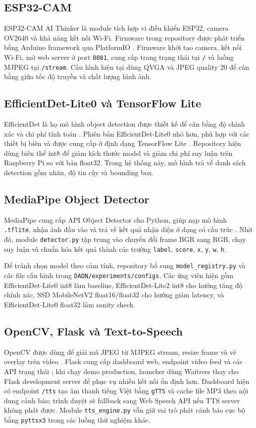 \documentclass[oneside,final]{hcmut-report}
\begin{document}
\subsection{ESP32-CAM}
ESP32-CAM AI Thinker là module tích hợp vi điều khiển ESP32, camera OV2640 và khả năng kết nối Wi-Fi. Firmware trong repository được phát triển bằng Arduino framework qua PlatformIO \citep{platformio}. Firmware khởi tạo camera, kết nối Wi-Fi, mở web server ở port \texttt{8081}, cung cấp trang trạng thái tại \texttt{/} và luồng MJPEG tại \texttt{/stream}. Cấu hình hiện tại dùng QVGA và JPEG quality 20 để cân bằng giữa tốc độ truyền và chất lượng hình ảnh.

\subsection{EfficientDet-Lite0 và TensorFlow Lite}
EfficientDet là họ mô hình object detection được thiết kế để cân bằng độ chính xác và chi phí tính toán \citep{tan2020efficientdet}. Phiên bản EfficientDet-Lite0 nhỏ hơn, phù hợp với các thiết bị biên và được cung cấp ở định dạng TensorFlow Lite \citep{tensorflowlite}. Repository hiện dùng biến thể int8 để giảm kích thước model và giảm chi phí suy luận trên Raspberry Pi so với bản float32. Trong hệ thống này, mô hình trả về danh sách detection gồm nhãn, độ tin cậy và bounding box.

\subsection{MediaPipe Object Detector}
MediaPipe cung cấp API Object Detector cho Python, giúp nạp mô hình \texttt{.tflite}, nhận ảnh đầu vào và trả về kết quả nhận diện ở dạng có cấu trúc \citep{mediapipeobjectdetector}. Nhờ đó, module \texttt{detector.py} tập trung vào chuyển đổi frame BGR sang RGB, chạy suy luận và chuẩn hóa kết quả thành các trường \texttt{label}, \texttt{score}, \texttt{x}, \texttt{y}, \texttt{w}, \texttt{h}.

Để tránh chọn model theo cảm tính, repository bổ sung \texttt{model\_registry.py} và các file cấu hình trong \texttt{DADN/experiments/configs}. Các ứng viên hiện gồm EfficientDet-Lite0 int8 làm baseline, EfficientDet-Lite2 int8 cho hướng tăng độ chính xác, SSD MobileNetV2 float16/float32 cho hướng giảm latency, và EfficientDet-Lite0 float32 làm sanity check.

\subsection{OpenCV, Flask và Text-to-Speech}
OpenCV được dùng để giải mã JPEG từ MJPEG stream, resize frame và vẽ overlay trên video \citep{opencv}. Flask cung cấp dashboard web, endpoint video feed và các API trạng thái \citep{flask}; khi chạy demo production, launcher dùng Waitress thay cho Flask development server để phục vụ nhiều kết nối ổn định hơn. Dashboard hiện có endpoint \texttt{/tts} tạo âm thanh tiếng Việt bằng \texttt{gTTS} và cache file MP3 theo nội dung cảnh báo; trình duyệt sẽ fallback sang Web Speech API nếu TTS server không phát được. Module \texttt{tts\_engine.py} vẫn giữ vai trò phát cảnh báo cục bộ bằng \texttt{pyttsx3} trong các luồng thử nghiệm khác.
\end{document}
